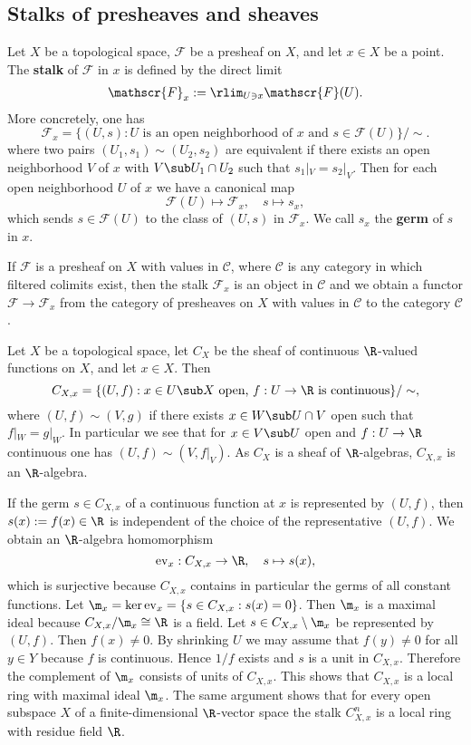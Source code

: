 \subsection{Stalks of presheaves and sheaves}
Let $X$ be a topological space, $\mathscr{F}$ be a presheaf on $X$, and let $x\in X$ be a point. The \textbf{stalk} of $\mathscr{F}$ in $x$ is defined by the direct limit
\begin{align*}
\mathscr{F}_x:=\rlim_{U\ni x}\mathscr{F}(U).
\end{align*}
More concretely, one has
\[\mathscr{F}_x=\{(U,s):\text{$U$ is an open neighborhood of $x$ and $s\in\mathscr{F}(U)$}\}/\sim.\]
where two pairs $(U_1,s_1)\sim(U_2,s_2)$ are equivalent if there exists an open neighborhood $V$ of $x$ with $V\sub U_1\cap U_2$ such that $s_1|_V=s_2|_V$. Then for each open neighborhood $U$ of $x$ we have a canonical map
\[\mathscr{F}(U)\mapsto\mathscr{F}_x,\quad s\mapsto s_x,\]
which sends $s\in\mathscr{F}(U)$ to the class of $(U,s)$ in $\mathscr{F}_x$. We call $s_x$ the \textbf{germ} of $s$ in $x$.
\begin{remark}
If $\mathscr{F}$ is a presheaf on $X$ with values in $\mathcal{C}$, where $\mathcal{C}$ is any category in which filtered colimits exist, then the stalk $\mathscr{F}_x$ is an object in $\mathcal{C}$ and we obtain a functor $\mathscr{F}\to\mathscr{F}_x$ from the category of presheaves on $X$ with values in $\mathcal{C}$ to the category $\mathcal{C}$.
\end{remark}
\begin{example}
Let $X$ be a topological space, let $C_X$ be the sheaf of continuous $\R$-valued functions on $X$, and let $x\in X$. Then
\[C_{X,x}=\{(U,f):\text{$x\in U\sub X$ open, $f:U\to\R$ is continuous}\}/\sim,\]
where $(U,f)\sim(V,g)$ if there exists $x\in W\sub U\cap V$ open such that $f|_W=g|_W$. In particular we see that for $x\in V\sub U$ open and $f:U\to\R$ continuous one has $(U,f)\sim(V,f|_V)$. As $C_X$ is a sheaf of $\R$-algebras, $C_{X,x}$ is an $\R$-algebra.\par
If the germ $s\in C_{X,x}$ of a continuous function at $x$ is represented by $(U,f)$, then $s(x):=f(x)\in\R$ is independent of the choice of the representative $(U,f)$. We obtain an $\R$-algebra homomorphism 
\[\mathrm{ev}_x:C_{X,x}\to\R,\quad s\mapsto s(x),\]
which is surjective because $C_{X,x}$ contains in particular the germs of all constant functions. Let $\m_x=\ker\mathrm{ev}_x=\{s\in C_{X,x}:s(x)=0\}$. Then $\m_x$ is a maximal ideal because $C_{X,x}/\m_x\cong\R$ is a field. Let $s\in C_{X,x}\setminus\m_x$ be represented by $(U,f)$. Then $f(x)\neq 0$. By shrinking $U$ we may assume that $f(y)\neq0$ for all $y\in Y$ because $f$ is continuous. Hence $1/f$ exists and $s$ is a unit in $C_{X,x}$. Therefore the complement of $\m_x$ consists of units of $C_{X,x}$. This shows that $C_{X,x}$ is a local ring with maximal ideal $\m_x$. The same argument shows that for every open subspace $X$ of a finite-dimensional $\R$-vector space the stalk $C_{X,x}^n$ is a local ring with residue field $\R$.
\end{example}
